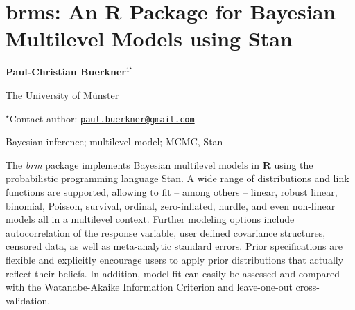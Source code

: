 \documentclass[\main/boa.tex]{subfiles}
\begin{document}
\section{brms: An R Package for Bayesian Multilevel Models using Stan}

\begin{center}
  {\bf {} Paul-Christian Buerkner$^{1^\star}$}
\end{center}

\vskip 0.3cm

\begin{affiliations}
\begin{enumerate}
\begin{minipage}{0.915\textwidth}
\centering
\item The University of Münster \\[-2pt]
\end{minipage}
\end{enumerate}
$^\star$Contact author: \href{mailto:paul.buerkner@gmail.com}{\nolinkurl{paul.buerkner@gmail.com}}\\
\end{affiliations}

\vskip 0.5cm

\begin{minipage}{0.915\textwidth}
\keywords Bayesian inference; multilevel model; MCMC, Stan
\packages {}
\end{minipage}

\vskip 0.8cm

The \emph{brm} package implements Bayesian multilevel models in
\textbf{R} using the probabilistic programming language Stan. A wide
range of distributions and link functions are supported, allowing to fit
-- among others -- linear, robust linear, binomial, Poisson, survival,
ordinal, zero-inflated, hurdle, and even non-linear models all in a
multilevel context. Further modeling options include autocorrelation of
the response variable, user defined covariance structures, censored
data, as well as meta-analytic standard errors. Prior specifications are
flexible and explicitly encourage users to apply prior distributions
that actually reflect their beliefs. In addition, model fit can easily
be assessed and compared with the Watanabe-Akaike Information Criterion
and leave-one-out cross-validation.
\end{document}
